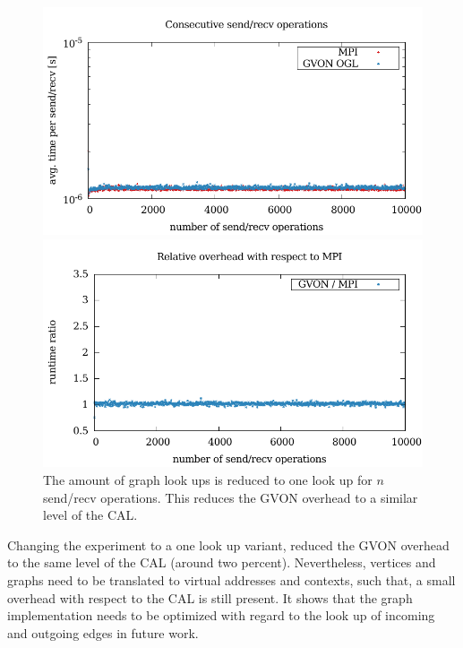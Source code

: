\begin{figure}[H]
  \begin{minipage}[t]{0.5\textwidth} 
    \includegraphics[width=\textwidth]{plots/50_nsend_one_lookup_laser}
  \end{minipage}%
  \begin{minipage}[t]{0.5\textwidth}
    \includegraphics[width=\textwidth]{plots/50_nsend_one_lookup_overhead_gvon_laser}
  \end{minipage}%
  \caption{The amount of graph look ups is reduced to one look up for
    $n$ send/recv operations.  This reduces the GVON overhead to
    a similar level of the CAL.}
  \label{fig:nsend_one_lookup_kepler}
\end{figure}

\noindent Changing the experiment to a one look up variant, reduced
the GVON overhead to the same level of the CAL (around two
percent). Nevertheless, vertices and graphs need to be translated to
virtual addresses and contexts, such that, a small overhead with
respect to the CAL is still present. It shows that the graph
implementation needs to be optimized with regard to the look up of
incoming and outgoing edges in future work.

